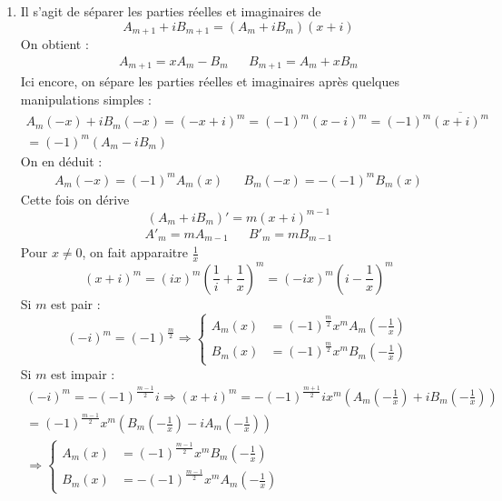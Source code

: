 \begin{enumerate}
\item Il s'agit de séparer les parties réelles et imaginaires de
\begin{displaymath}
 A_{m+1}+iB_{m+1} = (A_m+iB_m)(x+i)
\end{displaymath}
On obtient :
\begin{align*}
A_{m+1} =xA_m-B_m & & B_{m+1}= A_m+xB_m
\end{align*}
Ici encore, on sépare les parties réelles et imaginaires après quelques manipulations simples :
\begin{multline*}
 A_m(-x)+iB_m(-x) = (-x+i)^m = (-1)^m (x-i)^m 
= (-1)^m \overline{(x+i)^m} \\
= (-1)^m(A_m-iB_m)
\end{multline*}
On en déduit :
\begin{align*}
 A_m(-x)=(-1)^mA_m(x) & & B_m(-x)=-(-1)^mB_m(x)
\end{align*}
Cette fois on dérive 
\begin{displaymath}
 (A_m+iB_m)' = m(x+i)^{m-1}
\end{displaymath}
\begin{align*}
 A'_m = mA_{m-1} & & B'_m = mB_{m-1}
\end{align*}
Pour $x\neq0$, on fait apparaitre $\frac{1}{x}$
\begin{displaymath}
 (x+i)^m = (ix)^m \left(\frac{1}{i}+\frac{1}{x} \right)^m
= (-ix)^m \left(i-\frac{1}{x} \right)^m
\end{displaymath}
Si $m$ est pair :
\begin{displaymath}
 (-i)^m =(-1)^\frac{m}{2} \Rightarrow
\left\lbrace 
\begin{aligned}
 A_m(x) &= (-1)^\frac{m}{2}x^m A_m(-\frac{1}{x})\\
 B_m(x) &= (-1)^\frac{m}{2}x^m B_m(-\frac{1}{x})
\end{aligned}
\right. 
\end{displaymath}
Si $m$ est impair :
\begin{multline*}
 (-i)^m = -(-1)^\frac{m-1}{2}i 
\Rightarrow
(x+i)^m= -(-1)^\frac{m+1}{2}i x^m \left(A_m(-\frac{1}{x})+iB_m(-\frac{1}{x}) \right) \\
= (-1)^\frac{m-1}{2} x^m\left(B_m(-\frac{1}{x}) - iA_m(-\frac{1}{x}) \right)
\\
\Rightarrow
\left\lbrace 
\begin{aligned}
 A_m(x) &= (-1)^\frac{m-1}{2}x^m B_m(-\frac{1}{x})\\
 B_m(x) &= -(-1)^\frac{m-1}{2}x^m A_m(-\frac{1}{x})
\end{aligned}
\right. 
\end{multline*}


\end{enumerate}
